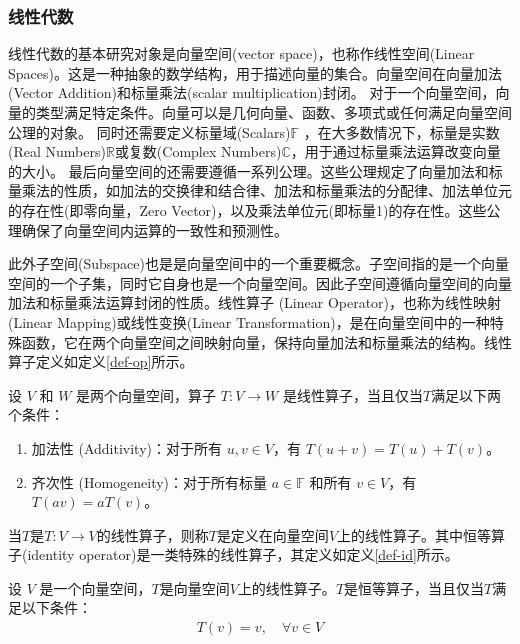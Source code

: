 \subsubsection*{线性代数}
线性代数的基本研究对象是向量空间(vector space)，也称作线性空间(Linear Spaces)。这是一种抽象的数学结构，用于描述向量的集合。向量空间在向量加法(Vector Addition)和标量乘法(scalar multiplication)封闭\cite{greub2012linear}。
对于一个向量空间，向量的类型满足特定条件。向量可以是几何向量、函数、多项式或任何满足向量空间公理的对象。
同时还需要定义标量域(Scalars)\(\mathbb{F}\) ，在大多数情况下，标量是实数(Real Numbers)\(\mathbb{R}\)或复数(Complex Numbers)\(\mathbb{C}\)，用于通过标量乘法运算改变向量的大小。
最后向量空间的还需要遵循一系列公理。这些公理规定了向量加法和标量乘法的性质，如加法的交换律和结合律、加法和标量乘法的分配律、加法单位元的存在性(即零向量，Zero Vector)，以及乘法单位元(即标量1)的存在性。这些公理确保了向量空间内运算的一致性和预测性。

此外子空间(Subspace)也是是向量空间中的一个重要概念。子空间指的是一个向量空间的一个子集，同时它自身也是一个向量空间。因此子空间遵循向量空间的向量加法和标量乘法运算封闭的性质。线性算子 (Linear Operator)，也称为线性映射(Linear Mapping)或线性变换(Linear Transformation)，是在向量空间中的一种特殊函数，它在两个向量空间之间映射向量，保持向量加法和标量乘法的结构。线性算子定义如定义\ref{def-op}所示。%
\begin{definition}\citep{greub2012linear}
    \label{def-op}
    设 \(V\) 和 \(W\) 是两个向量空间，算子 \(T: V \rightarrow W\) 是线性算子，当且仅当\(T\)满足以下两个条件：
\begin{enumerate}
    \item 加法性 (Additivity)：对于所有 \(u, v \in V\)，有 \(T(u + v) = T(u) + T(v)\)。
    \item 齐次性 (Homogeneity)：对于所有标量 \(a \in \mathbb{F}\) 和所有 \(v \in V\)，有 \(T(av) = aT(v)\)。
\end{enumerate}
\end{definition}

当$T$是\(T: V \rightarrow V\)的线性算子，则称$T$是定义在向量空间$V$上的线性算子。其中恒等算子(identity operator)是一类特殊的线性算子，其定义如定义\ref{def-id}所示。
\begin{definition}\citep{greub2012linear}
    \label{def-id}
    设 \(V\) 是一个向量空间，$T$是向量空间$V$上的线性算子。$T$是恒等算子，当且仅当$T$满足以下条件：
    \begin{align}
        T(v) = v,\quad \forall v \in V
    \end{align}
\end{definition}

